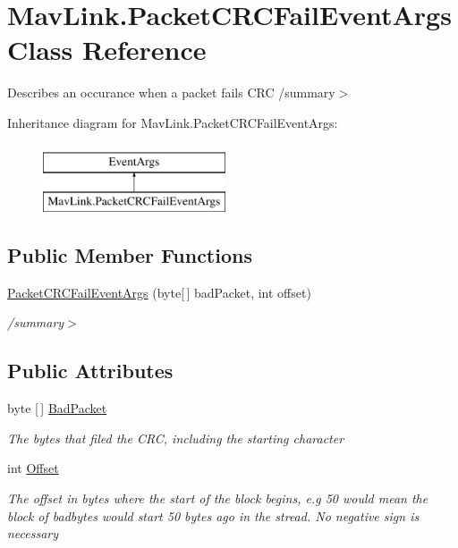 \hypertarget{classMavLink_1_1PacketCRCFailEventArgs}{}\section{Mav\+Link.\+Packet\+C\+R\+C\+Fail\+Event\+Args Class Reference}
\label{classMavLink_1_1PacketCRCFailEventArgs}


Describes an occurance when a packet fails C\+RC /summary$>$  


Inheritance diagram for Mav\+Link.\+Packet\+C\+R\+C\+Fail\+Event\+Args\+:\begin{figure}[H]
\begin{center}
\leavevmode
\includegraphics[height=2.000000cm]{classMavLink_1_1PacketCRCFailEventArgs}
\end{center}
\end{figure}
\subsection*{Public Member Functions}
\begin{DoxyCompactItemize}
\item 
\mbox{\hyperlink{classMavLink_1_1PacketCRCFailEventArgs_ae4ed19b215ab5f71c63da96af562e65c}{Packet\+C\+R\+C\+Fail\+Event\+Args}} (byte\mbox{[}$\,$\mbox{]} bad\+Packet, int offset)
\begin{DoxyCompactList}\small\item\em /summary$>$ \end{DoxyCompactList}\end{DoxyCompactItemize}
\subsection*{Public Attributes}
\begin{DoxyCompactItemize}
\item 
byte \mbox{[}$\,$\mbox{]} \mbox{\hyperlink{classMavLink_1_1PacketCRCFailEventArgs_afd82c1af031117d7d64a27fc2c5d24a5}{Bad\+Packet}}
\begin{DoxyCompactList}\small\item\em The bytes that filed the C\+RC, including the starting character \end{DoxyCompactList}\item 
int \mbox{\hyperlink{classMavLink_1_1PacketCRCFailEventArgs_a1313cf99a833ab9967fc1e6301f52eb0}{Offset}}
\begin{DoxyCompactList}\small\item\em The offset in bytes where the start of the block begins, e.\+g 50 would mean the block of badbytes would start 50 bytes ago in the stread. No negative sign is necessary \end{DoxyCompactList}\end{DoxyCompactItemize}


